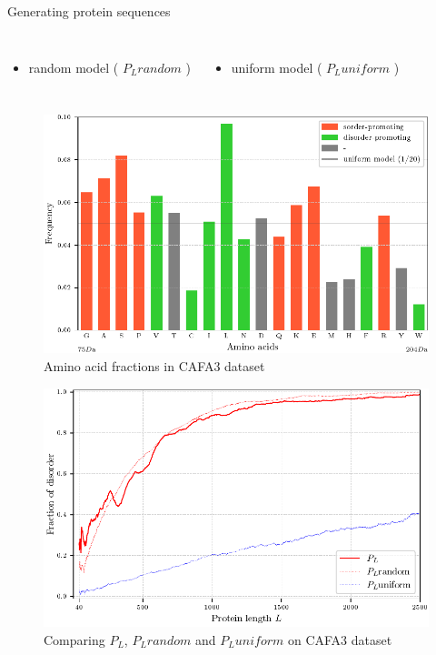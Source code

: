 \documentclass{beamer}
\begin{document}
\begin{frame}{Generating protein sequences}
  \begin{columns}
  \begin{itemize} \item random model ( $P_L random$  ) \end{itemize}
    \begin{itemize} \item uniform model ( $P_L uniform$ ) \end{itemize}
  \end{columns}

  \begin{figure}[th]
    \centering
    \includegraphics[scale=0.7]{plots/AK_ucestalost}
    \vspace{-0.2cm}
    \caption{ \footnotesize Amino acid fractions in CAFA3 dataset }
  \end{figure}
\end{frame}

\begin{frame}
  \begin{figure}[th]
    \centering
    \includegraphics[scale=0.8]{plots/PL_F_cmp}
    \caption{Comparing $P_L$, $P_L random$ and $P_L uniform$ on CAFA3 dataset}
  \end{figure}
\end{frame}
\end{document}
